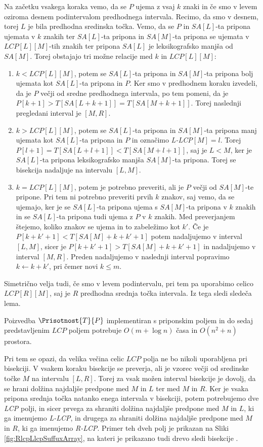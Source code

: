 Na začetku vsakega koraka vemo, da se $P$ ujema z vsaj $k$ znaki in če smo v levem oziroma desnem podintervalom predhodnega intervala. Recimo, da smo v desnem, torej $L$ je bila predhodna sredinska točka. Vemo, da se $P$ in $SA[L]$-ta pripona ujemata v $k$ znakih ter $SA[L]$-ta pripona in $SA[M]$-ta pripona se ujemata v $LCP[L][M]$-tih znakih ter pripona $SA[L]$ je leksikografsko manjša od $SA[M]$. Torej obstajajo tri možne relacije med $k$ in $LCP[L][M]$:
\begin{enumerate}
    \item $k<LCP[L][M]$, potem se $SA[L]$-ta pripona in $SA[M]$-ta pripona bolj ujemata kot $SA[L]$-ta pripona in $P$. Ker smo v predhodnem koraku izvedeli, da je $P$ večji od sredne predhodnega intervala, po tem pomeni, da je $P[k+1]>T[SA[L+k+1]]=T[SA[M+k+1]]$. Torej naslednji pregledani interval je $[M,R]$.
    \item $k>LCP[L][M]$, potem se $SA[L]$-ta pripona in $SA[M]$-ta pripona manj ujemata kot $SA[L]$-ta pripona in $P$ in označimo \textit{L-LCP}$[M]=l$. Torej $P[l+1]=T[SA[L+l+1]]<T[SA[M+l+1]]$, saj je $L<M$, ker je $SA[L]$-ta pripona leksikografsko manjša $SA[M]$-ta pripona. Torej se bisekcija nadaljuje na intervalu $[L,M]$.
    \item $k=LCP[L][M]$, potem je potrebno preveriti, ali je $P$ večji od $SA[M]$-te pripone. Pri tem ni potrebno preveriti prvih $k$ znakov, saj vemo, da se ujemajo, ker je se $SA[L]$-ta pripona ujema s $SA[M]$-ta pripona v $k$ znakih in se $SA[L]$-ta pripona tudi ujema z $P$ v $k$ znakih. Med preverjanjem štejemo, koliko znakov se ujema in to zabeležimo kot $k'$. Če je $P[k+k'+1]<T[SA[M]+k+k'+1]$ potem nadaljujemo v interval $[L,M]$, sicer je $P[k+k'+1]>T[SA[M]+k+k'+1]$ in nadaljujemo v interval $[M,R]$. Preden nadaljujemo v naslednji interval popravimo $k\leftarrow k+k'$, pri čemer novi $k\le m$.
\end{enumerate}
Simetrično velja tudi, če smo v levem podintervalu, pri tem pa uporabimo celico $LCP[R][M]$, saj je $R$ predhodna srednja točka intervala. Iz tega sledi sledeča lema.


\begin{lema}\label{lema:LCP}
    Poizvedba $\Prisotnost{T}{P}$ implementiran s priponskim poljem in do sedaj predstavljenim $LCP$ poljem potrebuje $O(m+\log{n})$ časa in $O(n^2 +n)$ prostora.
\end{lema}


Pri tem se opazi, da velika večina celic $LCP$ polja ne bo nikoli uporabljena pri bisekciji. V vsakem koraku bisekcije se preverja, ali je vzorec večji od sredinske točke $M$ na intervalu $[L,R]$. Torej za vsak možen interval bisekcije je dovolj, da se hrani dolžina najdaljše predpone med $M$ in $L$ ter med $M$ in $R$. Ker je vsaka pripona srednja točka natanko enega intervala v bisekciji, potem potrebujemo dve \textit{LCP} polji, in sicer prvega za shraniti dolžina najdaljše predpone med $M$ in $L$, ki ga imenujemo \textit{L-LCP}, in drugega za shraniti dolžina najdaljše predpone med $M$ in $R$, ki ga imenujemo \textit{R-LCP}. Primer teh dveh polj je prikazan na Sliki \ref{fig:RlcpLlcpSuffuxArray}, na kateri je prikazano tudi drevo sledi bisekcije \cite{Manber1990}. 

